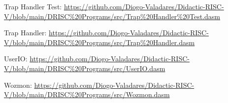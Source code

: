 \documentclass[
	12pt,				%
	openright,			%
	oneside,			%
	a4paper,			%
	english,			%
	french,				%
	spanish,			%
	brazil,				%
	]{abntex2}
\begin{document}
Trap Handler Test: \url{https://github.com/Diogo-Valadares/Didactic-RISC-V/blob/main/DRISC%20Programs/src/Trap%20Handler%20Test.dasm}

Trap Handler: \url{https://github.com/Diogo-Valadares/Didactic-RISC-V/blob/main/DRISC%20Programs/src/Trap%20Handler.dasm}

UserIO: \url{https://github.com/Diogo-Valadares/Didactic-RISC-V/blob/main/DRISC%20Programs/src/UserIO.dasm}

Wozmon: \url{https://github.com/Diogo-Valadares/Didactic-RISC-V/blob/main/DRISC%20Programs/src/Wozmon.dasm}







\end{document}
